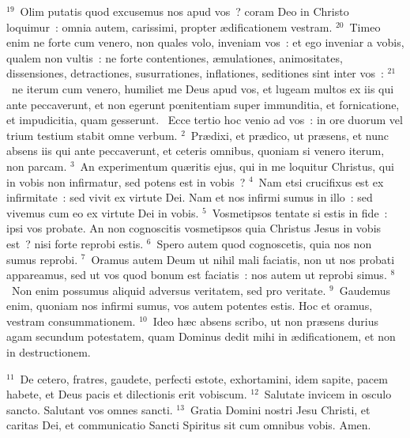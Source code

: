 ${}^{19}$~Olim putatis quod excusemus nos apud vos~? coram Deo in Christo loquimur~: omnia autem, carissimi, propter \ae dificationem vestram.
${}^{20}$~Timeo enim ne forte cum venero, non quales volo, inveniam vos~: et ego inveniar a vobis, qualem non vultis~: ne forte contentiones, \ae mulationes, animositates, dissensiones, detractiones, susurrationes, inflationes, seditiones sint inter vos~:
${}^{21}$~ne iterum cum venero, humiliet me Deus apud vos, et lugeam multos ex iis qui ante peccaverunt, et non egerunt pœnitentiam super immunditia, et fornicatione, et impudicitia, quam gesserunt.
~\lettrine[lines=10,image=true,loversize=0.05,lraise=-0.03]{E}{}cce tertio hoc venio ad vos~: in ore duorum vel trium testium stabit omne verbum.
${}^{2}$~Pr\ae dixi, et pr\ae dico, ut pr\ae sens, et nunc absens iis qui ante peccaverunt, et ceteris omnibus, quoniam si venero iterum, non parcam.
${}^{3}$~An experimentum qu\ae ritis ejus, qui in me loquitur Christus, qui in vobis non infirmatur, sed potens est in vobis~?
${}^{4}$~Nam etsi crucifixus est ex infirmitate~: sed vivit ex virtute Dei. Nam et nos infirmi sumus in illo~: sed vivemus cum eo ex virtute Dei in vobis.
${}^{5}$~Vosmetipsos tentate si estis in fide~: ipsi vos probate. An non cognoscitis vosmetipsos quia Christus Jesus in vobis est~? nisi forte reprobi estis.
${}^{6}$~Spero autem quod cognoscetis, quia nos non sumus reprobi.
${}^{7}$~Oramus autem Deum ut nihil mali faciatis, non ut nos probati appareamus, sed ut vos quod bonum est faciatis~: nos autem ut reprobi simus.
${}^{8}$~Non enim possumus aliquid adversus veritatem, sed pro veritate.
${}^{9}$~Gaudemus enim, quoniam nos infirmi sumus, vos autem potentes estis. Hoc et oramus, vestram consummationem.
${}^{10}$~Ideo h\ae c absens scribo, ut non pr\ae sens durius agam secundum potestatem, quam Dominus dedit mihi in \ae dificationem, et non in destructionem.


${}^{11}$~De cetero, fratres, gaudete, perfecti estote, exhortamini, idem sapite, pacem habete, et Deus pacis et dilectionis erit vobiscum.
${}^{12}$~Salutate invicem in osculo sancto. Salutant vos omnes sancti.
${}^{13}$~Gratia Domini nostri Jesu Christi, et caritas Dei, et communicatio Sancti Spiritus sit cum omnibus vobis. Amen.
